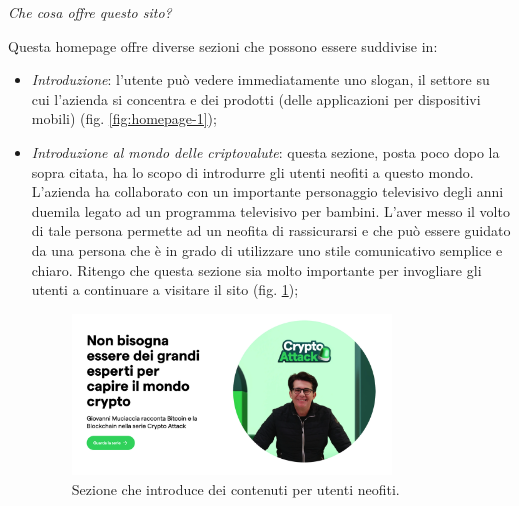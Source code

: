 \centerline{\textit{Che cosa offre questo sito?}}
Questa homepage offre diverse sezioni che possono essere suddivise in:
\begin{itemize}
  \item \textit{Introduzione}: l'utente può vedere immediatamente uno 
  slogan, il settore su cui l'azienda si concentra e dei prodotti (delle 
  applicazioni per dispositivi mobili) (fig. \ref{fig:homepage-1});

  \item \textit{Introduzione al mondo delle criptovalute}: questa sezione, 
  posta poco dopo la sopra citata, ha lo scopo di introdurre gli utenti 
  neofiti a questo mondo. L'azienda ha collaborato con un importante 
  personaggio televisivo degli anni duemila legato ad un programma televisivo 
  per bambini. L'aver messo il volto di tale persona permette ad un neofita 
  di rassicurarsi e che può essere guidato da una persona che è in grado 
  di utilizzare uno stile comunicativo semplice e chiaro. Ritengo che 
  questa sezione sia molto importante per invogliare gli utenti a continuare 
  a visitare il sito (fig. \ref{fig:introduction-1});
  \begin{figure}[H]
    \centering
    \includegraphics[width=0.80\textwidth]{res/images/introduction-1.png}
    \caption{Sezione che introduce dei contenuti per utenti neofiti.}
    \label{fig:introduction-1}
  \end{figure}


\end{itemize}
